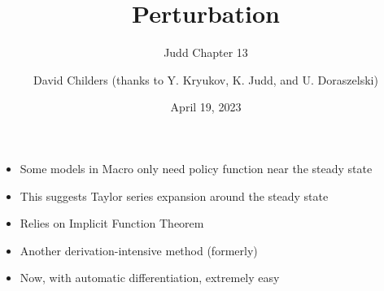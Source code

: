 \documentclass[bigger,handout]{beamer}
\begin{document}
\title[47-809: Perturbation]{Perturbation}
\subtitle{Judd Chapter 13}
\author[David Childers]{David Childers (thanks to Y. Kryukov, K. Judd, and U. Doraszelski)}
\date[Apr.-19]{April 19, 2023}
\maketitle

 
 
\begin{frame}%
 

\begin{itemize}
\item Some models in Macro only need policy function \newline
near the steady state

\item This suggests Taylor series expansion around the steady state

\item Relies on Implicit Function Theorem

\item Another derivation-intensive method (formerly)

\item Now, with automatic differentiation, extremely easy
\end{itemize}

 
 
\end{frame}%
 
 
 
\end{document}
